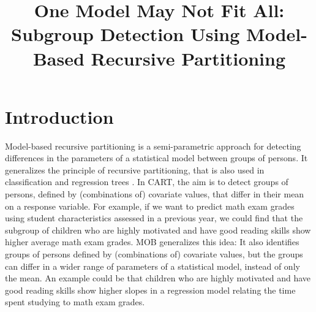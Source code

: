 \documentclass[doc,floatsintext,natbib]{apa7}
\title{One Model May Not Fit All: Subgroup Detection Using Model-Based Recursive Partitioning}
\begin{document}

\renewenvironment{Schunk}{\small}{}


\maketitle



\newpage
\section{Introduction}
\label{sec:Introduction}

Model-based recursive partitioning \citep[MOB;][]{ZeilyHoth08} is a semi-parametric approach for detecting differences in the parameters of a statistical model between groups of persons. It generalizes the principle of recursive partitioning, that is also used in classification and regression trees \citep[CART; ][]{Breetal:1984}. 
In CART, the aim is to detect groups of persons, defined by (combinations of) covariate values, that differ in their mean on a response variable. For example, if we want to predict math exam grades using student characteristics assessed in a previous year, we could find that the subgroup of children who are highly motivated and have good reading skills show higher average math exam grades. 
MOB generalizes this idea: It also identifies groups of persons defined by (combinations of) covariate values, but the groups can differ in a wider range of parameters of a statistical model, instead of only the mean. An example could be that children who are highly motivated and have good reading skills show higher slopes in a regression model relating the time spent studying to math exam grades. 
\end{document}

